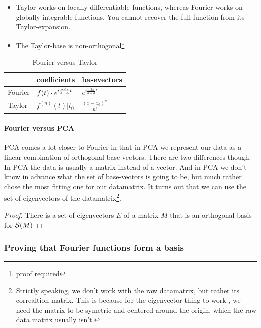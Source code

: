 \begin{itemize}
    \item Taylor works on locally differentiable functions, whereas Fourier works on globally integrable functions. You cannot recover the full function from its Taylor-expansion.
    
    \item The Taylor-base is non-orthogonal\footnote{proof required}
\end{itemize}

\begin{table}[ht]
\centering
\caption{Fourier versus Taylor}
\begin{tabular}{@{}lll@{}}
\toprule
        & coefficients                                              & basevectors                       \\ \midrule
Fourier & $f(t) \cdot e^{i \frac{n 2 \pi}{b-a} t}$             & $e^{i \frac{n 2 \pi}{b-a}  t}$    \\
Taylor  & $f^{(n)}(t)|t_0$                                          & $\frac{(x- x_0)^n}{n!}$          
\end{tabular}
\end{table}

\paragraph{Fourier versus PCA} PCA comes a lot closer to Fourier in that in PCA we represent our data as a linear combination of orthogonal base-vectors. There are two differences though. In PCA the data is usually a matrix instead of a vector. And in PCA we don't know in advance what the set of base-vectors is going to be, but much rather chose the most fitting one for our datamatrix. It turns out that we can use the set of eigenvectors of the datamatrix\footnote{Strictly speaking, we don't work with the raw datamatrix, but rather its correaltion matrix. This is because for the eigenvector thing to work , we need the matrix to be symetric and centered around the origin, which the raw data matrix usually isn't.}.

\begin{proof}There is a set of eigenvectors $E$ of a matrix $M$ that is an orthogonal basis for $\mathcal{S}(M)$
    \subprf{}{}{}
\end{proof}



\subsubsection{Proving that Fourier functions form a basis}


